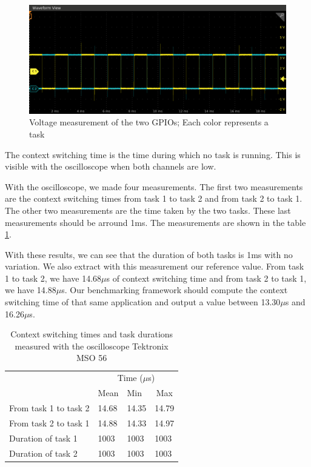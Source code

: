 \begin{figure}[!ht]
  \centering
  \includegraphics[scale=0.5]{assets/measurement-value-wave.png}
  \caption{\label{fig:measurement-value-wave}Voltage measurement of the two GPIOs; Each color represents a task}
\end{figure}

The context switching time is the time during which no task is running.
This is visible with the oscilloscope when both channels are low.

With the oscilloscope, we made four measurements.
The first two measurements are the context switching times from task 1 to task 2 and from task 2 to task 1.
The other two measurements are the time taken by the two tasks.
These last measurements should be arround 1ms.
The measurements are shown in the table \ref{tab:reference-measurement}.

With these results, we can see that the duration of both tasks is 1ms with no variation.
We also extract with this measurement our reference value.
From task 1 to task 2, we have 14.68$\mu$s of context switching time and from task 2 to task 1, we have 14.88$\mu$s.
Our benchmarking framework should compute the context switching time of that same application and output a value between 13.30$\mu$s and 16.26$\mu$s.

\begin{table}[!ht]
  \centering
  \begin{tabular}{llll}
                        & \multicolumn{3}{c}{Time ($\mu$s)}                              \\ \cline{2-4} 
                        & \multicolumn{1}{c}{Mean} & Min   & \multicolumn{1}{c}{Max} \\ \cline{2-4} 
  From task 1 to task 2 & 14.68                    & 14.35 & 14.79                   \\
  From task 2 to task 1 & 14.88                    & 14.33 & 14.97                   \\
  Duration of task 1    & 1003                     & 1003  & 1003                    \\
  Duration of task 2    & 1003                     & 1003  & 1003                   
  \end{tabular}
  \caption{Context switching times and task durations measured with the oscilloscope Tektronix MSO 56}
  \label{tab:reference-measurement}
\end{table}